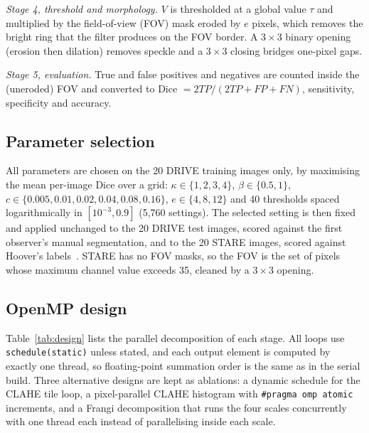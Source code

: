 \textit{Stage 4, threshold and morphology.} $V$ is thresholded at a global value $\tau$ and multiplied by the
field-of-view (FOV) mask eroded by $e$ pixels, which removes the bright ring that the filter produces on the FOV
border. A $3\times3$ binary opening (erosion then dilation) removes speckle and a $3\times3$ closing bridges
one-pixel gaps.

\textit{Stage 5, evaluation.} True and false positives and negatives are counted inside the (uneroded) FOV and
converted to Dice $=2TP/(2TP+FP+FN)$, sensitivity, specificity and accuracy.

\subsection{Parameter selection}\label{sec:tuning}
All parameters are chosen on the 20 DRIVE training images only, by maximising the mean per-image Dice over a
grid: $\kappa\in\{1,2,3,4\}$, $\beta\in\{0.5,1\}$,
$c\in\{0.005,\allowbreak 0.01,\allowbreak 0.02,\allowbreak 0.04,\allowbreak 0.08,\allowbreak 0.16\}$,
$e\in\{4,8,12\}$ and 40 thresholds spaced logarithmically in $[10^{-3},0.9]$ (5{,}760 settings). The selected
setting is then fixed and applied unchanged to the 20 DRIVE test images, scored against the first observer's
manual segmentation, and to the 20 STARE images, scored against Hoover's labels~\cite{hoover2000}. STARE has no
FOV masks, so the FOV is the set of pixels whose maximum channel value exceeds 35, cleaned by a $3\times3$
opening.

\subsection{OpenMP design}\label{sec:omp}
Table~\ref{tab:design} lists the parallel decomposition of each stage. All loops use
\texttt{schedule(static)} unless stated, and each output element is computed by exactly one thread, so
floating-point summation order is the same as in the serial build. Three alternative designs are kept as
ablations: a dynamic schedule for the CLAHE tile loop, a pixel-parallel CLAHE histogram with
\texttt{\#pragma omp atomic} increments, and a Frangi decomposition that runs the four scales concurrently with
one thread each instead of parallelising inside each scale.

